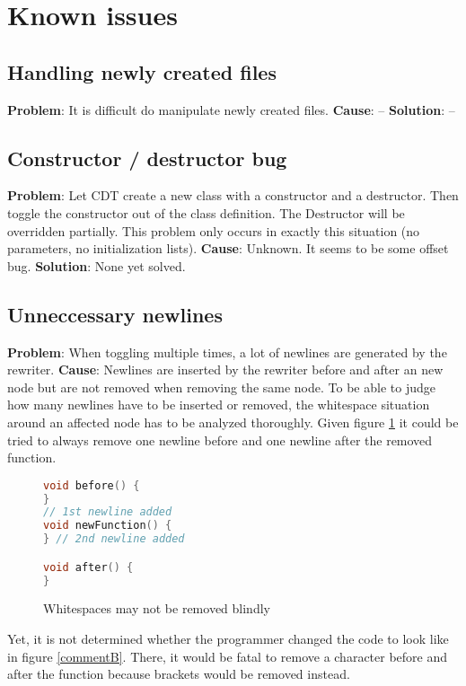 \section{Known issues}

\subsection{Handling newly created files}
\textbf{Problem}: It is difficult do manipulate newly created files.
\textbf{Cause}: --
\textbf{Solution}: --

\subsection{Constructor / destructor bug}
\textbf{Problem}: Let CDT create a new class with a constructor and a destructor. 
Then toggle the constructor out of the class definition. The Destructor will be 
overridden partially. This problem only occurs in exactly this situation (no 
parameters, no initialization lists).
\textbf{Cause}: Unknown. It seems to be some offset bug.
\textbf{Solution}: None yet solved.

\subsection{Unneccessary newlines}
\textbf{Problem}: When toggling multiple times, a lot of newlines are generated 
by the rewriter. 
\textbf{Cause}: Newlines are inserted by the rewriter before and after an new
node but are not removed when removing the same node. To be able to judge how 
many newlines have to be inserted or removed, the whitespace situation around an 
affected node has to be analyzed thoroughly. Given figure \ref{commentA} it 
could be tried to always remove one newline before and one newline after the 
removed function.

\begin{figure}[h]
\begin{lstlisting}[language=C++]
void before() {
}
// 1st newline added
void newFunction() {
} // 2nd newline added

void after() {
}
\end{lstlisting}
\setlength{\abovecaptionskip}{-20pt}
\caption{Whitespaces may not be removed blindly}
\label{commentA}
\end{figure}

Yet, it is not determined whether the programmer changed the code to look like 
in figure \ref{commentB}. There, it would be fatal to remove a character before 
and after the function because brackets would be removed instead.

